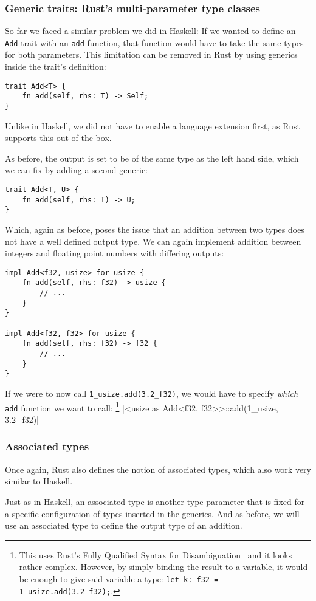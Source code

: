 \subsubsection{Generic traits: Rust's multi-parameter type classes}

So far we faced a similar problem we did in Haskell: If we wanted to define an \verb|Add| trait with an \verb|add| function, that function would have to take the same types for both parameters. This limitation can be removed in Rust by using generics inside the trait's definition:
\begin{verbatim}
trait Add<T> {
    fn add(self, rhs: T) -> Self;
}
\end{verbatim}
Unlike in Haskell, we did not have to enable a language extension first, as Rust supports this out of the box.

As before, the output is set to be of the same type as the left hand side, which we can fix by adding a second generic:
\begin{verbatim}
trait Add<T, U> {
    fn add(self, rhs: T) -> U;
}
\end{verbatim}
Which, again as before, poses the issue that an addition between two types does not have a well defined output type. We can again implement addition between integers and floating point numbers with differing outputs:
\begin{verbatim}
impl Add<f32, usize> for usize {
    fn add(self, rhs: f32) -> usize {
        // ...
    }
}

impl Add<f32, f32> for usize {
    fn add(self, rhs: f32) -> f32 {
        // ...
    }
}
\end{verbatim}
If we were to now call \verb|1_usize.add(3.2_f32)|, we would have to specify \textit{which} \verb|add| function we want to call:
\footnote{This uses Rust's Fully Qualified Syntax for Disambiguation~\cite{rust-book} and it looks rather complex. However, by simply binding the result to a variable, it would be enough to give said variable a type: \verb|let k: f32 = 1_usize.add(3.2_f32);|.}
|<usize as Add<f32, f32>>::add(1_usize, 3.2_f32)|

\subsubsection{Associated types}

Once again, Rust also defines the notion of associated types, which also work very similar to Haskell.

Just as in Haskell, an associated type is another type parameter that is fixed for a specific configuration of types inserted in the generics. And as before, we will use an associated type to define the output type of an addition.


